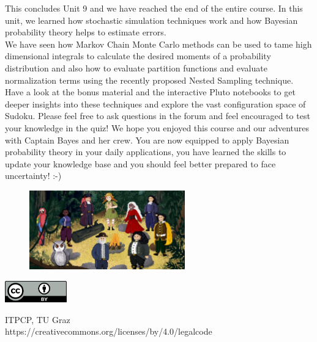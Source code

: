 \documentclass[12pt, a4paper]{scrartcl}
\begin{document}
This concludes Unit 9 and we have reached the end of the entire course. In
this unit, we learned how stochastic simulation techniques work and how
Bayesian probability theory helps to estimate errors.\\
We have seen how Markov Chain Monte Carlo methods can be used to tame
high dimensional integrals to calculate the desired moments of a probability distribution and also how to evaluate partition functions and evaluate
normalization terms using the recently proposed Nested Sampling technique.\\

Have a look at the bonus material and the interactive Pluto notebooks to get
deeper insights into these techniques and explore the vast configuration space
of Sudoku.
Please feel free to ask questions in the forum and feel encouraged to test your
knowledge in the quiz!
We hope you enjoyed this course and our adventures with Captain Bayes
and her crew. You are now equipped to apply Bayesian probability theory in
your daily applications, you have learned the skills to update your knowledge
base and you should feel better prepared to face uncertainty! :-)
 \begin{figure}[H]
	\centering
	\includegraphics[width=0.6\textwidth]{9_8.png}
\end{figure}

\vspace{2cm}
\begin{minipage}[t]{1\textwidth}
	\raggedleft
	\centering
	\includegraphics[width = 0.20\textwidth]{CC-BY_icon}
	\vspace{0.2cm}
	
	\centering
	{\large ITPCP, TU Graz} \\
	https://creativecommons.org/licenses/by/4.0/legalcode
\end{minipage}
\end{document}

